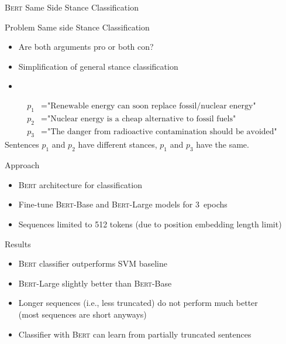 \documentclass[english,handout]{mlutalk}
\newcommand{\Bert}{\textsc{Bert}\xspace}
\newcommand{\BertBase}{\textsc{Bert}-Base\xspace}
\newcommand{\BertLarge}{\textsc{Bert}-Large\xspace}
\begin{document}
\begin{frame}[allowframebreaks]{\Bert Same Side Stance Classification~\cite{OllingerDSBS2020}}
  
  \begin{block}{Problem}
    Same side  Stance Classification
    \begin{itemize}
      \item Are both arguments pro or both con?
      \item Simplification of general stance classification
      \item 
    \end{itemize}
  \end{block}

  \begin{example}
    \begin{align}
      p_1 &= \text{"Renewable energy can soon replace fossil/nuclear energy"} \\
      p_2 &= \text{"Nuclear energy is a cheap alternative to fossil fuels"} \\
      p_3 &= \text{"The danger from radioactive contamination should be avoided"}
    \end{align}
    Sentences \(p_1\) and \(p_2\) have different stances, \(p_1\) and \(p_3\) have the same.
  \end{example}
  
  \framebreak
  
  \begin{block}{Approach}
    \begin{itemize}
      \item \Bert architecture for classification
      \item Fine-tune \BertBase and \BertLarge models for 3~epochs
      \item Sequences limited to 512 tokens (due to position embedding length limit)
    \end{itemize}
  \end{block}

  \begin{block}{Results}
    \begin{itemize}
      \item \Bert classifier outperforms SVM baseline
      \item \BertLarge slightly better than \BertBase
      \item Longer sequences (i.e., less truncated) do not perform much better \\ (most sequences are short anyways)
      \item Classifier with \Bert can learn from partially truncated sentences
    \end{itemize}
  \end{block}

\end{frame}
\end{document}

